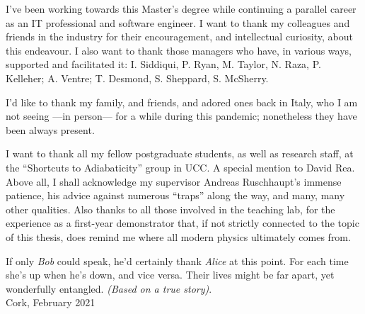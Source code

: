 I've been working towards this Master's degree
while continuing a parallel career
as an IT professional and software engineer.
I want to thank my
colleagues and friends in the industry for their encouragement,
and intellectual curiosity,
about this endeavour.
I also want to thank those managers
who have, in various ways, supported and facilitated it:
I. Siddiqui, P. Ryan, M. Taylor, N. Raza, P. Kelleher;
A. Ventre;
T. Desmond, S. Sheppard, S. McSherry.

I'd like to thank my family, and friends, and adored ones back in Italy,
who I am not seeing ---in person--- for a while during this pandemic;
nonetheless they have been always present.

I want to thank all my fellow postgraduate students,
as well as research staff,
at the ``Shortcuts to Adiabaticity'' group in UCC.
A special mention to David Rea.
Above all, I shall acknowledge my supervisor Andreas Ruschhaupt's immense patience,
his advice against numerous ``traps'' along the way, and many, many other qualities.
Also thanks to all those involved in the teaching lab, for the experience as a
first-year demonstrator that,
if not strictly connected to the topic of this thesis,
does remind me where all modern physics ultimately comes from.

If only \emph{Bob} could speak, he'd certainly thank \emph{Alice} at this point.
For each time she's up when he's down, and vice versa.
Their lives might be far apart, yet wonderfully entangled.
\emph{(Based on a true story)}.
\\

\noindent{}Cork, February 2021
